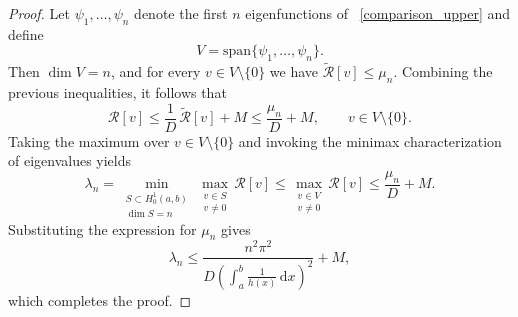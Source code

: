\documentclass[10pt,a4paper]{amsart}
\begin{document}
\begin{proof}
Let $\psi_1,\dots,\psi_n$ denote the first $n$ eigenfunctions of ~\eqref{comparison_upper} and define
\[
V=\mathrm{span}\{\psi_1,\dots,\psi_n\}.
\]
Then $\dim V=n$, and for every $v\in V\setminus\{0\}$ we have
\(
\tilde{\mathcal{R}}[v]\le\mu_n
\).
Combining the previous inequalities, it follows that
\[
\mathcal{R}[v]
\le
\frac{1}{D}\,\tilde{\mathcal{R}}[v] + M
\le
\frac{\mu_n}{D} + M,
\qquad v\in V\setminus\{0\}.
\]
Taking the maximum over $v\in V\setminus\{0\}$ and invoking the minimax characterization of eigenvalues yields
\[
\lambda_n
=
\min_{\substack{S\subset H_0^1(a,b)\\ \dim S=n}}
\max_{\substack{v\in S\\ v\neq 0}}
\mathcal{R}[v]
\le
\max_{\substack{v\in V\\ v\neq 0}}
\mathcal{R}[v]
\le
\frac{\mu_n}{D} + M.
\]
Substituting the expression for $\mu_n$ gives
\[
\lambda_n
\le
\frac{n^2\pi^2}
     {D\left(\displaystyle\int_a^b \frac{1}{h(x)}\,\mathrm{d}x\right)^2}
+ M,
\]
which completes the proof.
\qedhere
\end{proof}
\end{document}
